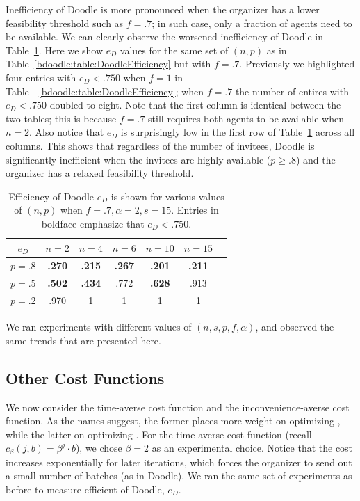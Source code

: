 Inefficiency of Doodle is more pronounced when the organizer has a lower feasibility threshold such as $f = .7$; in such case, only a fraction of agents need to be available. 
We can clearly observe the worsened inefficiency of Doodle in Table~\ref{bdoodle:table:DoodleEfficiency-lower-attendance}. 
Here we show $e_{D}$ values for the same set of $(n, p)$ as in Table~\ref{bdoodle:table:DoodleEfficiency} but with $f = .7$. 
Previously we highlighted four entries with $e_{D} < .750$ when $f = 1$ in Table~~\ref{bdoodle:table:DoodleEfficiency}; when $f = .7$ the number of entires with $e_{D} < .750$ doubled to eight. 
Note that the first column is identical between the two tables; this is because $f = .7$ still requires both agents to be available when $n = 2$. 
Also notice that $e_{D}$ is surprisingly low in the first row of Table~\ref{bdoodle:table:DoodleEfficiency-lower-attendance} across all columns. This shows that regardless of the number of invitees, Doodle is significantly inefficient when the invitees are highly available ($p \geq .8$) and the organizer has a relaxed feasibility threshold.
\begin{table}[h]  \small
\centering
\begin{tabular}{|c|c|c|c|c|c|c|}
	\hline
	$e_{D}$ & $n = 2$ & $n = 4$ & $n = 6$ & $ n = 10 $ & $n = 15$ \\ \hline
	$p = .8$ & \textbf{.270} & \textbf{.215} & \textbf{.267} & \textbf{.201} & \textbf{.211} \\ \hline
	$p = .5$ & \textbf{.502} & \textbf{.434} & .772 & \textbf{.628} & .913  \\ \hline
	$p = .2$ & .970 & 1 & 1 & 1 & 1\\ \hline	
\end{tabular}
\caption{Efficiency of Doodle $e_{D}$ is shown for various values of $(n, p)$ when $f = .7, \alpha=2, s = 15$.  Entries in boldface emphasize that $e_{D} < .750$. } \label{bdoodle:table:DoodleEfficiency-lower-attendance}
\end{table}

We ran experiments with different values of $(n, s, p, f, \alpha)$, and observed the same  trends that are presented here.



\subsection{Other Cost Functions}
We now consider the time-averse cost function and the inconvenience-averse cost function. As the names suggest, the former places more weight on optimizing \Time, while the latter on optimizing \Inconvenience.  For the time-averse cost function (recall $c_{\beta}(j, b) = \beta^j \cdot b$), we chose $\beta = 2$ as an experimental choice. Notice that the cost increases exponentially for later iterations, which forces the organizer to send out a small number of batches (as in Doodle). We ran the same set of experiments as before to measure efficient of Doodle, $e_{D}$. 

